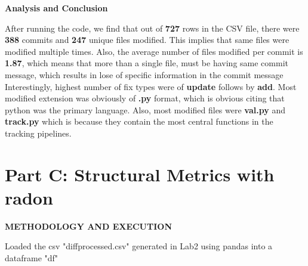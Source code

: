 \documentclass[12pt, a4paper]{report}
\newcommand{\sectionbar}[1]{%
  \vspace{0.6\baselineskip}%
  \noindent
  \colorbox{sectionbar}{%
    \parbox{\dimexpr\linewidth-2\fboxsep\relax}{%
      \textbf{\Large\textsf{#1}}%
    }%
  }%
  \vspace{0.6\baselineskip}
}
\begin{document}
\sectionbar{Analysis and Conclusion}

After running the code, we find that out of \textbf{727} rows in the CSV file, there were \textbf{388} commits and \textbf{247} unique files modified. This implies that same files were modified multiple times.
Also, the average number of files modified per commit is \textbf{1.87}, which means that more than a single file, must be having same commit message, which results in lose of specific information in the commit message
\newline
Interestingly, highest number of fix types were of \textbf{update} follows by \textbf{add}.
Most modified extension was obviously of \textbf{.py} format, which is obvious citing that python was the primary language. Also, most modified files were \textbf{val.py} and \textbf{track.py} which is because they contain the most central functions in the tracking pipelines.

\section{Part C: Structural Metrics with radon}

\sectionbar{METHODOLOGY AND EXECUTION}
Loaded the csv "diffprocessed.csv" generated in Lab2 using pandas into a dataframe "df"
\end{document}
